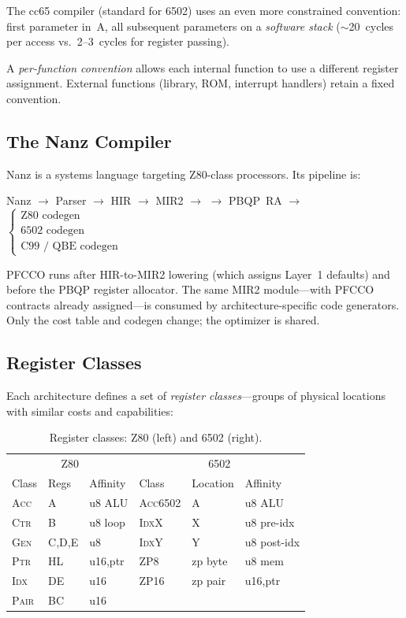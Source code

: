 \documentclass[sigplan,screen,nonacm]{acmart}
\begin{document}
\noindent The cc65 compiler (standard for 6502) uses an even more
constrained convention: first parameter in~A, all subsequent parameters
on a \emph{software stack} ($\sim$20~cycles per access vs.\ 2--3~cycles
for register passing).

A \emph{per-function convention} allows each internal function to use a
different register assignment.  External functions (library, ROM, interrupt
handlers) retain a fixed convention.

\subsection{The Nanz Compiler}

Nanz is a systems language targeting Z80-class processors.  Its pipeline is:
%
\begin{center}
\small
Nanz $\to$ Parser $\to$ HIR $\to$ MIR2 $\to$  $\to$ PBQP~RA $\to$
$\begin{cases}
  \text{Z80 codegen} \\
  \text{6502 codegen} \\
  \text{C99 / QBE codegen}
\end{cases}$
\end{center}
%
PFCCO runs after HIR-to-MIR2 lowering (which assigns Layer~1 defaults) and
before the PBQP register allocator.  The same MIR2 module---with PFCCO
contracts already assigned---is consumed by architecture-specific code
generators.  Only the cost table and codegen change; the optimizer is shared.

\subsection{Register Classes}
\label{sec:classes}

Each architecture defines a set of \emph{register classes}---groups of
physical locations with similar costs and capabilities:

\begin{table}[h]
\centering\small
\caption{Register classes: Z80 (left) and 6502 (right).}
\label{tab:classes}
\begin{tabular}{@{}lll|lll@{}}
\toprule
\multicolumn{3}{c|}{Z80} & \multicolumn{3}{c}{6502} \\
Class & Regs & Affinity & Class & Location & Affinity \\
\midrule
\textsc{Acc}  & A   & u8 ALU   & \textsc{Acc6502} & A   & u8 ALU \\
\textsc{Ctr}  & B   & u8 loop  & \textsc{IdxX}    & X   & u8 pre-idx \\
\textsc{Gen}  & C,D,E & u8    & \textsc{IdxY}    & Y   & u8 post-idx \\
\textsc{Ptr}  & HL  & u16,ptr  & \textsc{ZP8}     & zp byte & u8 mem \\
\textsc{Idx}  & DE  & u16      & \textsc{ZP16}    & zp pair & u16,ptr \\
\textsc{Pair} & BC  & u16      & & & \\
\bottomrule
\end{tabular}
\end{table}
\end{document}
